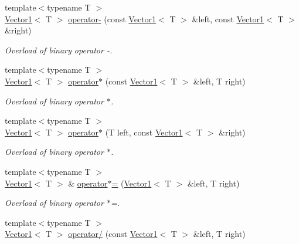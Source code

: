 \begin{DoxyCompactItemize}
{\footnotesize template$<$typename T $>$ }\\\hyperlink{class_triton_1_1_util_1_1_vector1}{Vector1}$<$ T $>$ \hyperlink{class_triton_1_1_util_1_1_vector1_a1094f567d2865ee5d36ce22bde608260}{operator-\/} (const \hyperlink{class_triton_1_1_util_1_1_vector1}{Vector1}$<$ T $>$ \&left, const \hyperlink{class_triton_1_1_util_1_1_vector1}{Vector1}$<$ T $>$ \&right)
\begin{DoxyCompactList}\small\item\em Overload of binary operator -\/. \end{DoxyCompactList}\item 
{\footnotesize template$<$typename T $>$ }\\\hyperlink{class_triton_1_1_util_1_1_vector1}{Vector1}$<$ T $>$ \hyperlink{class_triton_1_1_util_1_1_vector1_ab1b522600e6551482ead1a3030bae02b}{operator$\ast$} (const \hyperlink{class_triton_1_1_util_1_1_vector1}{Vector1}$<$ T $>$ \&left, T right)
\begin{DoxyCompactList}\small\item\em Overload of binary operator $\ast$. \end{DoxyCompactList}\item 
{\footnotesize template$<$typename T $>$ }\\\hyperlink{class_triton_1_1_util_1_1_vector1}{Vector1}$<$ T $>$ \hyperlink{class_triton_1_1_util_1_1_vector1_a32665d4805eabc6a1b57c8c8313ec520}{operator$\ast$} (T left, const \hyperlink{class_triton_1_1_util_1_1_vector1}{Vector1}$<$ T $>$ \&right)
\begin{DoxyCompactList}\small\item\em Overload of binary operator $\ast$. \end{DoxyCompactList}\item 
{\footnotesize template$<$typename T $>$ }\\\hyperlink{class_triton_1_1_util_1_1_vector1}{Vector1}$<$ T $>$ \& \hyperlink{class_triton_1_1_util_1_1_vector1_ae8263e2fa81292823605129b52c3484a}{operator$\ast$=} (\hyperlink{class_triton_1_1_util_1_1_vector1}{Vector1}$<$ T $>$ \&left, T right)
\begin{DoxyCompactList}\small\item\em Overload of binary operator $\ast$=. \end{DoxyCompactList}\item 
{\footnotesize template$<$typename T $>$ }\\\hyperlink{class_triton_1_1_util_1_1_vector1}{Vector1}$<$ T $>$ \hyperlink{class_triton_1_1_util_1_1_vector1_a0e9891fc7123a22352eb6d74dfe7c28f}{operator/} (const \hyperlink{class_triton_1_1_util_1_1_vector1}{Vector1}$<$ T $>$ \&left, T right)

\end{DoxyCompactItemize}
